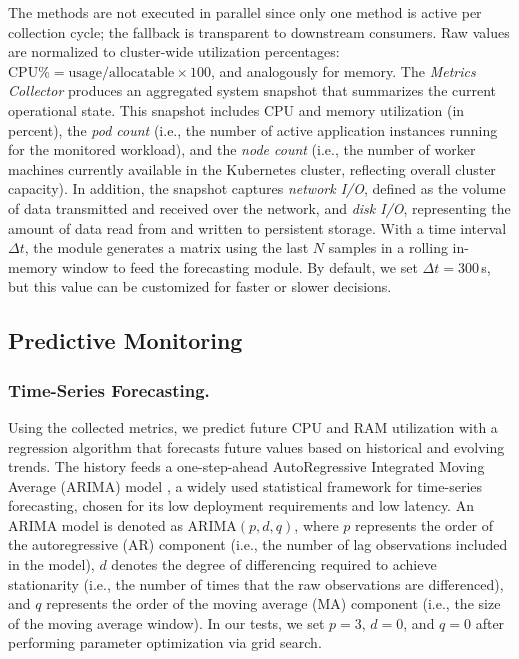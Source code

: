 \documentclass[sigconf]{acmart}
\begin{document}
The methods are not executed in parallel since only one method is active per collection cycle; the fallback is transparent to downstream consumers.  Raw values are normalized to cluster-wide utilization percentages: $\text{CPU\%} = \text{usage} / \text{allocatable} \times 100$, and analogously for memory.  
The \emph{Metrics Collector} produces an aggregated system snapshot that summarizes the current operational state. This snapshot includes CPU and memory utilization (in percent), the \emph{pod count} (i.e., the number of active application instances running for the monitored workload), and the \emph{node count} (i.e., the number of worker machines currently available in the Kubernetes cluster, reflecting overall cluster capacity).
In addition, the snapshot captures \emph{network I/O}, defined as the volume of data transmitted and received over the network, and \emph{disk I/O}, representing the amount of data read from and written to persistent storage.
With a time interval $\Delta t$, the module generates a matrix using the last $N$ samples in a rolling in-memory window to feed the forecasting module. By default, we set $\Delta t =300$\,s, but this value can be customized for faster or slower decisions.

\subsection{Predictive Monitoring}
\label{sec:prediction}

\subsubsection{Time-Series Forecasting.}
Using the collected metrics, we predict future CPU and RAM utilization with a regression algorithm that forecasts future values based on historical and evolving trends. The history feeds a one-step-ahead AutoRegressive Integrated Moving Average (ARIMA) model \cite{box2015timeseries}, a widely used statistical framework for time-series forecasting, chosen for its low deployment requirements and low latency.
An ARIMA model is denoted as ARIMA$(p,d,q)$, where $p$ represents the order of the autoregressive (AR) component (i.e., the number of lag observations included in the model), 
$d$ denotes the degree of differencing required to achieve stationarity (i.e., the number of times that the raw observations are differenced), 
and $q$ represents the order of the moving average (MA) component (i.e., the size of the moving average window).
In our tests, we set $p = 3$, $d = 0$, and $q = 0$ after performing parameter optimization via grid search.
\end{document}
